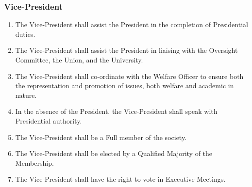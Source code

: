 \documentclass{scrartcl}
\begin{document}
            \subsubsection{Vice-President}
                \label{executive--positions--vice-president}
                \begin{enumerate}
                    \item The Vice-President shall assist the President in the completion of Presidential duties.
                    \item The Vice-President shall assist the President in liaising with the Oversight Committee, the Union, and the University.
                    \item The Vice-President shall co-ordinate with the Welfare Officer to ensure both the representation and promotion of issues, both welfare and academic in nature.
                    \item In the absence of the President, the Vice-President shall speak with Presidential authority.
                    \item The Vice-President shall be a Full member of the society.
                    \item The Vice-President shall be elected by a Qualified Majority of the Membership.
                    \item The Vice-President shall have the right to vote in Executive Meetings.
                \end{enumerate}
\end{document}
